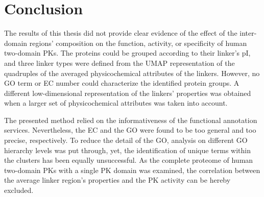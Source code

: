 \chapter{Conclusion}
\label{conclusion}

The results of this thesis did not provide clear evidence of the effect of the
inter-domain regions' composition on the function, activity, or specificity of human
two-domain PKs.
The proteins could be grouped according to their linker's pI, and three linker types were
defined from the UMAP representation of the quadruples of the averaged physicochemical
attributes of the linkers.
However, no GO term or EC number could characterize the identified protein groups.
A different low-dimensional representation of the linkers' properties was obtained when
a larger set of physicochemical attributes was taken into account.

The presented method relied on the informativeness of the functional annotation services.
Nevertheless, the EC and the GO were found to be too general and too precise,
respectively.
To reduce the detail of the GO, analysis on different GO hierarchy levels was put through,
yet, the identification of unique terms within the clusters has been equally unsuccessful.
As the complete proteome of human two-domain PKs with a single PK domain was examined,
the correlation between the average linker region's properties and the PK activity can be
hereby excluded.


%
